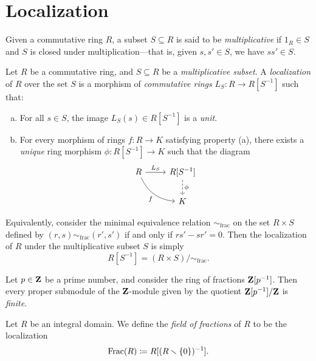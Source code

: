 \section{Localization}

\begin{definition}
\label{def:multiplicative-subset}
Given a commutative ring \(R\), a subset \(S \subseteq R\) is said to be
\emph{multiplicative} if \(1_R \in S\) and \(S\) is closed under
multiplication---that is, given \(s, s' \in S\), we have \(s s' \in S\).
\end{definition}

\begin{definition}[Localization]
\label{def:localization-ring}
Let \(R\) be a commutative ring, and \(S \subseteq R\) be a \emph{multiplicative
  subset}. A \emph{localization} of \(R\) over the set \(S\) is a morphism of
\emph{commutative rings} \(L_S: R \to R[S^{-1}]\) such that:
\begin{enumerate}[(a)]\setlength\itemsep{0em}
\item For all \(s \in S\), the image \(L_S(s) \in R[S^{-1}]\) is a \emph{unit}.
\item For every morphism of rings \(f: R \to K\) satisfying property (a), there
  exists a \emph{unique} ring morphism \(\phi: R[S^{-1}] \to K\) such that the
  diagram
  \[
  \begin{tikzcd}
  R \ar[r, "L_S"] \ar[rd, bend right, "f"']
  &{R[S^{-1}]} \ar[d, "\phi", dashed] \\
  &K
  \end{tikzcd}
  \]
\end{enumerate}
Equivalently, consider the minimal equivalence relation \(\sim_{\text{frac}}\)
on the set \(R \times S\) defined by \((r, s) \sim_{\text{frac}} (r', s')\) if
and only if \(r s' - s r' = 0\). Then the localization of \(R\) under the
multiplicative subset \(S\) is simply
\[
R[S^{-1}] = (R \times S)/{\sim_{\text{frac}}}.
\]
\end{definition}

\begin{example}
\label{exp:Z[1/p]/Z-finite-submodules}
Let \(p \in \mathbf{Z}\) be a prime number, and consider the ring of fractions
\(\mathbf{Z}[p^{-1}]\). Then every proper submodule of the \(\mathbf{Z}\)-module given by the
quotient \(\mathbf{Z}[p^{-1}]/\mathbf{Z}\) is \emph{finite}.
\end{example}

\begin{definition}
\label{def:field-of-fractions}
Let \(R\) be an integral domain. We define the \emph{field of fractions} of
\(R\) to be the localization
\[
\operatorname{Frac}(R) \coloneq R[(R \smallsetminus \{0\})^{-1}].
\]
\end{definition}

